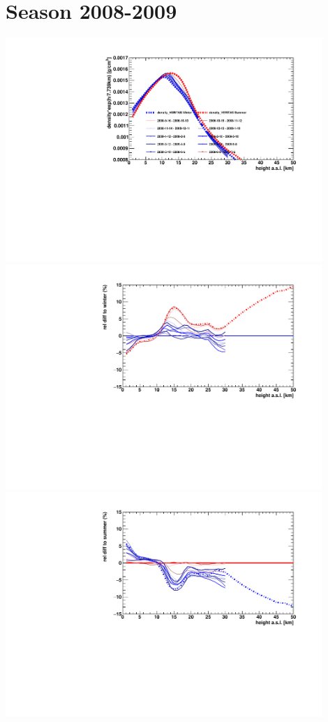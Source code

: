 \section*{Season 2008-2009}
\noindent\begin{minipage}{\textwidth}
\centering
\includegraphics[width=0.9\textwidth]{season-2008-2009-density.pdf}
\includegraphics[width=0.9\textwidth]{season-relativeWinter-2008-2009-density.pdf}
\includegraphics[width=0.9\textwidth]{season-relativeSummer-2008-2009-density.pdf}
\end{minipage}

